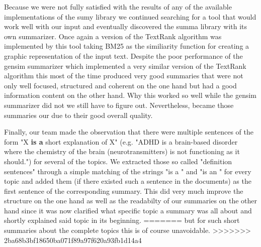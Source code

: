 Because we were not fully satisfied with the results of any of the available implementations of the sumy library we continued searching for a tool that would work well with our input and eventually discovered the summa library with its own summarizer. Once again a version of the TextRank algorithm was implemented by this tool taking BM25 as the similiarity function for creating a graphic representation of the input text. Despite the poor performance of the gensim summarizer which implemented a very similar version of the TextRank algorithm this most of the time produced very good summaries that were not only well focused, structured and coherent on the one hand but had a good information content on the other hand. Why this worked so well while the gensim summarizer did not we still have to figure out. Nevertheless, became those summaries our  due to their good overall quality.  
 
Finally, our team made the observation that there were multiple sentences of the form "X \textbf{is a} short explanation of X" (e.g. "ADHD is a brain-based disorder where the chemistry of the brain (neurotransmitters) is not functioning as it should.") for several of the topics. We extracted those so called "definition sentences" through a simple matching of the strings "is a " and "is an " for every topic and added them (if there existed such a sentence in the documents) as the first sentence of the corresponding summary. This did very much improve the structure on the one hand as well as the readabilty of our summaries on the other hand since it was now clarified what specific topic a summary was all about and shortly explained said topic in its beginning.  
=======
but for such short summaries about the complete topics this is of course unavoidable.
>>>>>>> 2ba68b3bf18650ba071f89a97f620a93fb1d14a4
